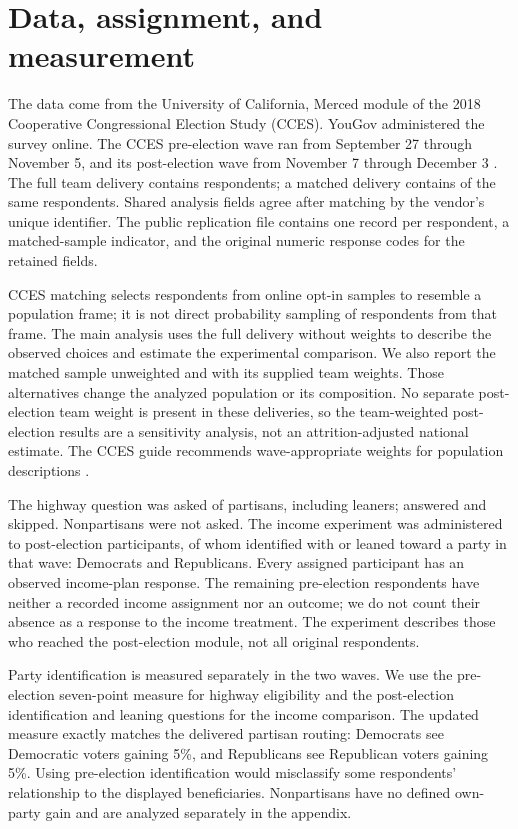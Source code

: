 \documentclass[11pt]{article}
\begin{document}
\section{Data, assignment, and measurement}
The data come from the University of California, Merced module of the 2018 Cooperative Congressional Election Study (CCES). YouGov administered the survey online. The CCES pre-election wave ran from September 27 through November 5, and its post-election wave from November 7 through December 3 \citep{cces2018}. The full team delivery contains \FullN{} respondents; a matched delivery contains \MatchedN{} of the same respondents. Shared analysis fields agree after matching by the vendor's unique identifier. The public replication file contains one record per respondent, a matched-sample indicator, and the original numeric response codes for the retained fields.

CCES matching selects respondents from online opt-in samples to resemble a population frame; it is not direct probability sampling of respondents from that frame. The main analysis uses the full delivery without weights to describe the observed choices and estimate the experimental comparison. We also report the matched sample unweighted and with its supplied team weights. Those alternatives change the analyzed population or its composition. No separate post-election team weight is present in these deliveries, so the team-weighted post-election results are a sensitivity analysis, not an attrition-adjusted national estimate. The CCES guide recommends wave-appropriate weights for population descriptions \citep{cces2018}.

The highway question was asked of \HighwayN{} partisans, including leaners; \HighwayObserved{} answered and \HighwayMissing{} skipped. Nonpartisans were not asked. The income experiment was administered to \PostN{} post-election participants, of whom \IncomeN{} identified with or leaned toward a party in that wave: \DemN{} Democrats and \RepN{} Republicans. Every assigned participant has an observed income-plan response. The remaining pre-election respondents have neither a recorded income assignment nor an outcome; we do not count their absence as a response to the income treatment. The experiment describes those who reached the post-election module, not all original respondents.

Party identification is measured separately in the two waves. We use the pre-election seven-point measure for highway eligibility and the post-election identification and leaning questions for the income comparison. The updated measure exactly matches the delivered partisan routing: Democrats see Democratic voters gaining 5\%, and Republicans see Republican voters gaining 5\%. Using pre-election identification would misclassify some respondents' relationship to the displayed beneficiaries. Nonpartisans have no defined own-party gain and are analyzed separately in the appendix.
\end{document}
